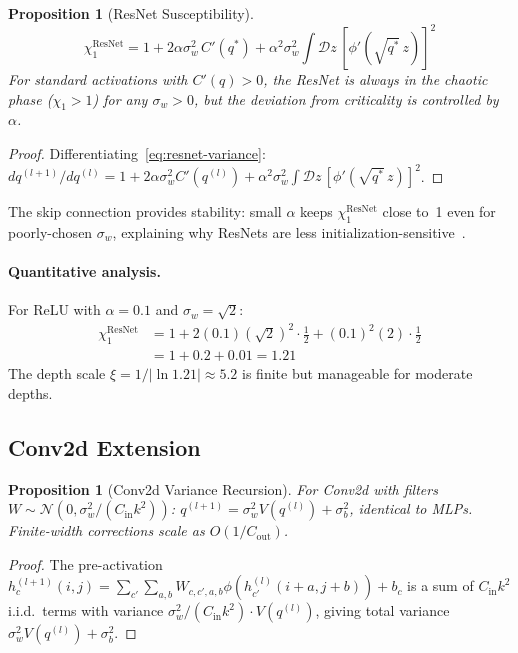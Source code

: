 \documentclass[10pt]{article}
\newtheorem{proposition}[theorem]{Proposition}
\begin{document}
\begin{proposition}[ResNet Susceptibility]
\label{prop:resnet-chi1}
\begin{equation}
    \chi_1^{\text{ResNet}} = 1 + 2\alpha\sigma_w^2\, C'(q^*) + \alpha^2 \sigma_w^2 \int \mathcal{D}z\, [\phi'(\sqrt{q^*}\, z)]^2
\end{equation}
For standard activations with $C'(q) > 0$, the ResNet is always in the chaotic phase ($\chi_1 > 1$) for any $\sigma_w > 0$, but the deviation from criticality is controlled by $\alpha$.
\end{proposition}

\begin{proof}
Differentiating~\eqref{eq:resnet-variance}:
$dq^{(l+1)}/dq^{(l)} = 1 + 2\alpha\sigma_w^2 C'(q^{(l)}) + \alpha^2 \sigma_w^2 \int \mathcal{D}z\, [\phi'(\sqrt{q^*}\, z)]^2$.
\end{proof}

The skip connection provides stability: small $\alpha$ keeps $\chi_1^{\text{ResNet}}$ close to~1 even for poorly-chosen $\sigma_w$, explaining why ResNets are less initialization-sensitive~\cite{yang2017mean}.

\paragraph{Quantitative analysis.}
For ReLU with $\alpha = 0.1$ and $\sigma_w = \sqrt{2}$:
\begin{align}
    \chi_1^{\text{ResNet}} &= 1 + 2(0.1)(\sqrt{2})^2 \cdot \frac{1}{2} + (0.1)^2 (2) \cdot \frac{1}{2} \\
    &= 1 + 0.2 + 0.01 = 1.21
\end{align}
The depth scale $\xi = 1/|\ln 1.21| \approx 5.2$ is finite but manageable for moderate depths.

\subsection{Conv2d Extension}

\begin{proposition}[Conv2d Variance Recursion]
\label{prop:conv-variance}
For Conv2d with filters $W \sim \mathcal{N}(0, \sigma_w^2/(C_{\mathrm{in}} k^2))$:
$q^{(l+1)} = \sigma_w^2 V(q^{(l)}) + \sigma_b^2$,
identical to MLPs. Finite-width corrections scale as $O(1/C_{\mathrm{out}})$.
\end{proposition}

\begin{proof}
The pre-activation $h_{c}^{(l+1)}(i,j) = \sum_{c'}\sum_{a,b} W_{c,c',a,b} \phi(h_{c'}^{(l)}(i+a, j+b)) + b_c$ is a sum of $C_{\mathrm{in}} k^2$ i.i.d.\ terms with variance $\sigma_w^2/(C_{\mathrm{in}} k^2) \cdot V(q^{(l)})$, giving total variance $\sigma_w^2 V(q^{(l)}) + \sigma_b^2$.
\end{proof}
\end{document}
